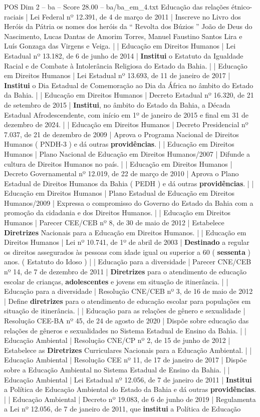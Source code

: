 \begin{textsample}{POS Dim 2 – ba – Score 28.00 – ba/ba\_em\_4.txt}
Educação das relações étnico-raciais | Lei Federal nº 12.391, de 4 de março de 2011 | Inscreve no Livro dos Heróis da Pátria os nomes dos heróis da “ Revolta dos Búzios ” João de Deus do Nascimento, Lucas Dantas de Amorim Torres, Manuel Faustino Santos Lira e Luís Gonzaga das Virgens e Veiga. | | Educação em Direitos Humanos | Lei Estadual nº 13.182, de 6 de junho de 2014 | \textbf{Institui} o Estatuto da Igualdade Racial e de Combate à Intolerância Religiosa do Estado da Bahia. | | Educação em Direitos Humanos | Lei Estadual nº 13.693, de 11 de janeiro de 2017 | \textbf{Institui} o Dia Estadual de Comemoração ao Dia da África no âmbito do Estado da Bahia. | | Educação em Direitos Humanos | Decreto Estadual nº 16.320, de 21 de setembro de 2015 | \textbf{Institui}, no âmbito do Estado da Bahia, a Década Estadual Afrodescendente, com início em 1º de janeiro de 2015 e final em 31 de dezembro de 2024. | | Educação em Direitos Humanos | Decreto Presidencial nº 7.037, de 21 de dezembro de 2009 | Aprova o Programa Nacional de Direitos Humanos ( PNDH-3 ) e dá outras \textbf{providências}. | | Educação em Direitos Humanos | Plano Nacional de Educação em Direitos Humanos/2007 | Difunde a cultura de Direitos Humanos no país. | | Educação em Direitos Humanos | Decreto Governamental nº 12.019, de 22 de março de 2010 | Aprova o Plano Estadual de Direitos Humanos da Bahia ( PEDH ) e dá outras \textbf{providências}. | | Educação em Direitos Humanos | Plano Estadual de Educação em Direitos Humanos/2009 | Expressa o compromisso do Governo do Estado da Bahia com a promoção da cidadania e dos Direitos Humanos. | | Educação em Direitos Humanos | Parecer CEE/CEB nº 8, de 30 de maio de 2012 | Estabelece \textbf{Diretrizes} Nacionais para a Educação em Direitos Humanos. | | Educação em Direitos Humanos | Lei nº 10.741, de 1º de abril de 2003 | \textbf{Destinado} a regular os direitos assegurados às pessoas com idade igual ou superior a 60 ( \textbf{sessenta} ) anos. ( Estatuto do Idoso ) | | Educação para a diversidade | Parecer CNE/CEB nº 14, de 7 de dezembro de 2011 | \textbf{Diretrizes} para o atendimento de educação escolar de crianças, \textbf{adolescentes} e jovens em situação de itinerância. | | Educação para a diversidade | Resolução CNE/CEB nº 3, de 16 de maio de 2012 | Define \textbf{diretrizes} para o atendimento de educação escolar para populações em situação de itinerância. | | Educação para as relações de gênero e sexualidade | Resolução CEE-BA nº 45, de 24 de agosto de 2020 | Dispõe sobre educação das relações de gêneros e sexualidades no Sistema Estadual de Ensino da Bahia. | | Educação Ambiental | Resolução CNE/CP nº 2, de 15 de junho de 2012 | Estabelece as \textbf{Diretrizes} Curriculares Nacionais para a Educação Ambiental. | | Educação Ambiental | Resolução CEE nº 11, de 17 de janeiro de 2017 | Dispõe sobre a Educação Ambiental no Sistema Estadual de Ensino da Bahia. | | Educação Ambiental | Lei Estadual nº 12.056, de 7 de janeiro de 2011 | \textbf{Institui} a Política de Educação Ambiental do Estado da Bahia e dá outras \textbf{providências}. | | Educação Ambiental | Decreto nº 19.083, de 6 de junho de 2019 | Regulamenta a Lei nº 12.056, de 7 de janeiro de 2011, que \textbf{institui} a Política de Educação 
\end{textsample}
